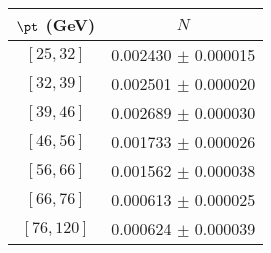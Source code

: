 \begin{tabular}{c||c}
$\pt$ (GeV) & $N$  \\
\hline
$[25, 32]$ & 0.002430 $\pm$ 0.000015\\
$[32, 39]$ & 0.002501 $\pm$ 0.000020\\
$[39, 46]$ & 0.002689 $\pm$ 0.000030\\
$[46, 56]$ & 0.001733 $\pm$ 0.000026\\
$[56, 66]$ & 0.001562 $\pm$ 0.000038\\
$[66, 76]$ & 0.000613 $\pm$ 0.000025\\
$[76, 120]$ & 0.000624 $\pm$ 0.000039\\
\end{tabular}
